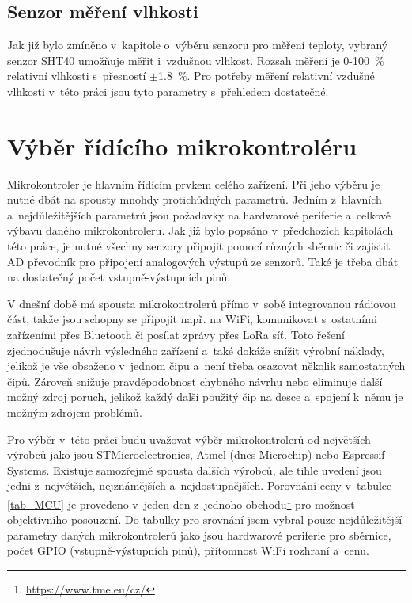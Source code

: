 \subsection{Senzor měření vlhkosti}

Jak již bylo zmíněno v~kapitole o~výběru senzoru pro měření teploty, vybraný senzor SHT40 umožňuje měřit i~vzdušnou vlhkost. Rozsah měření je \SI{0}{}-\SI{100}{\percent} relativní vlhkosti s~přesností $\pm$\SI{1,8}{\percent}. Pro potřeby měření relativní vzdušné vlhkosti v~této práci jsou tyto parametry s~přehledem dostatečné.

\section{Výběr řídícího mikrokontroléru}

Mikrokontroler je hlavním řídícím prvkem celého zařízení. Při jeho výběru je nutné dbát na spousty mnohdy protichůdných parametrů. Jedním z~hlavních a~nejdůležitějších parametrů jsou požadavky na hardwarové periferie a~celkově výbavu daného mikrokontroleru. Jak již bylo popsáno v~předchozích kapitolách této práce, je nutné všechny senzory připojit pomocí různých sběrnic či zajistit AD převodník pro připojení analogových výstupů ze senzorů. Také je třeba dbát na dostatečný počet vstupně-výstupních pinů.

V dnešní době má spousta mikrokontrolerů přímo v~sobě integrovanou rádiovou část, takže jsou schopny se připojit např. na WiFi, komunikovat s~ostatními zařízeními přes Bluetooth či posílat zprávy přes LoRa síť. Toto řešení zjednodušuje návrh výsledného zařízení a~také dokáže snížit výrobní náklady, jelikož je vše obsaženo v~jednom čipu a~není třeba osazovat několik samostatných čipů. Zároveň snižuje pravděpodobnost chybného návrhu nebo eliminuje další možný zdroj poruch, jelikož každý další použitý čip na desce a~spojení k~němu je možným zdrojem problémů.

Pro výběr v~této práci budu uvažovat výběr mikrokontrolerů od největších výrobců jako jsou STMicroelectronics, Atmel (dnes Microchip) nebo Espressif Systems. Existuje samozřejmě spousta dalších výrobců, ale tihle uvedení jsou jedni z~největších, nejznámějších a~nejdostupnějších. Porovnání ceny v~tabulce \ref{tab_MCU} je provedeno v~jeden den z~jednoho obchodu\footnote{\url{https://www.tme.eu/cz/}} pro možnost objektivního posouzení. Do tabulky pro srovnání jsem vybral pouze nejdůležitější parametry daných mikrokontrolerů jako jsou hardwarové periferie pro sběrnice, počet GPIO (vstupně-výstupních pinů), přítomnost WiFi rozhraní a~cenu.

